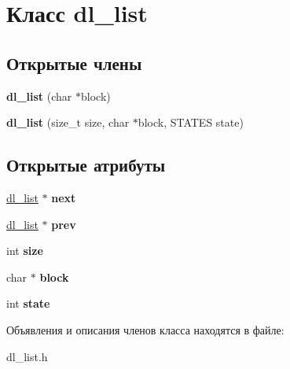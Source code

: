 \hypertarget{classdl__list}{}\section{Класс dl\+\_\+list}
\label{classdl__list}
\subsection*{Открытые члены}
\begin{DoxyCompactItemize}
\item 
\mbox{\label{classdl__list_a985726189d59b22aa4d88ecdb1758e72}} 
{\bfseries dl\+\_\+list} (char $\ast$block)
\item 
\mbox{\label{classdl__list_a46bb9a84a20e7b327f71b001d245ccbd}} 
{\bfseries dl\+\_\+list} (size\+\_\+t size, char $\ast$block, S\+T\+A\+T\+ES state)
\end{DoxyCompactItemize}
\subsection*{Открытые атрибуты}
\begin{DoxyCompactItemize}
\item 
\mbox{\label{classdl__list_a6b46a6692ac508af4ace20bde2a7d52d}} 
\mbox{\hyperlink{classdl__list}{dl\+\_\+list}} $\ast$ {\bfseries next}
\item 
\mbox{\label{classdl__list_a28afb658b7a9f6617c276506bb954c91}} 
\mbox{\hyperlink{classdl__list}{dl\+\_\+list}} $\ast$ {\bfseries prev}
\item 
\mbox{\label{classdl__list_a8c50269c26b5a85f5f96f187bfe9a4e0}} 
int {\bfseries size}
\item 
\mbox{\label{classdl__list_ab17cb8c9991c5e3e592d4ed15c17a32e}} 
char $\ast$ {\bfseries block}
\item 
\mbox{\label{classdl__list_a6bd57a6c32da90ab5c810e25a94061cb}} 
int {\bfseries state}
\end{DoxyCompactItemize}


Объявления и описания членов класса находятся в файле\+:\begin{DoxyCompactItemize}
\item 
dl\+\_\+list.\+h\end{DoxyCompactItemize}
